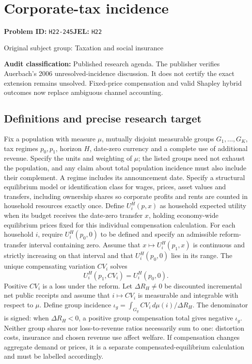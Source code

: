 \documentclass[11pt,a4paper]{article}
\begin{document}
\section*{Corporate-tax incidence}
\textbf{Problem ID:} \texttt{H22-245}\quad \textbf{JEL:} \texttt{H22}\par
\label{problem:OP-0474}
{\sffamily\small\color{muted}Original subject group: Taxation and social insurance\par}
\label{definitions:problem:30007756}
\textbf{Audit classification:} Published research agenda. The publisher verifies Auerbach’s 2006 unresolved-incidence discussion. It does not certify the exact extension remains unsolved. Fixed-price compensation and valid Shapley hybrid outcomes now replace ambiguous channel accounting.
\subsection*{Definitions and precise research target}
Fix a population with measure \(\mu\), mutually disjoint measurable groups \(G_1,\ldots,G_K\), tax regimes \(p_0,p_1\), horizon \(H\), date-zero currency and a complete use of additional revenue. Specify the units and weighting of \(\mu\); the listed groups need not exhaust the population, and any claim about total population incidence must also include their complement. A regime includes its announcement date. Specify a structural equilibrium model or identification class for wages, prices, asset values and transfers, including ownership shares so corporate profits and rents are counted in household resources exactly once. Define \(U_i^H(p,x)\) as household expected utility when its budget receives the date-zero transfer \(x\), holding economy-wide equilibrium prices fixed for this individual compensation calculation. For each household \(i\), require \(U_i^H(p_0,0)\) to be defined and specify an admissible reform-transfer interval containing zero. Assume that \(x\mapsto U_i^H(p_1,x)\) is continuous and strictly increasing on that interval and that \(U_i^H(p_0,0)\) lies in its range. The unique compensating variation \(CV_i\) solves
\[
 U_i^H(p_1,CV_i)=U_i^H(p_0,0).
\]
Positive \(CV_i\) is a loss under the reform. Let \(\Delta R_H\ne0\) be discounted incremental net public receipts and assume that \(i\mapsto CV_i\) is measurable and integrable with respect to \(\mu\). Define group incidence \(\iota_g=\int_{G_g}CV_i\,d\mu(i)/\Delta R_H\). The denominator is signed: when \(\Delta R_H<0\), a positive group compensation total gives negative \(\iota_g\). Neither group shares nor loss-to-revenue ratios necessarily sum to one: distortion costs, insurance and chosen revenue use affect welfare. If compensation changes aggregate demand or prices, it is a separate compensated-equilibrium calculation and must be labelled accordingly.
\end{document}
